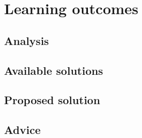 \section{Learning outcomes}
\label{sec:Learngin-Outcomes}

\subsection{Analysis}
\label{subsec:Analysis}

\subsection{Available solutions}
\label{subsec:Available solutions}

\subsection{Proposed solution}
\label{subsec:Proposed solution}

\subsection{Advice}
\label{subsec:Advice}

